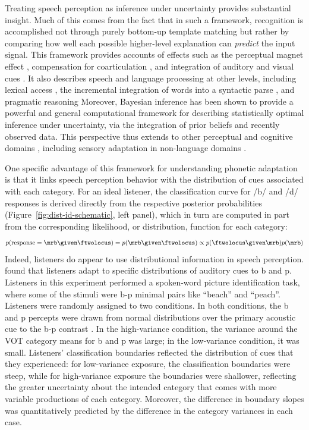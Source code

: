 Treating speech perception as inference under uncertainty provides substantial insight.  Much of this comes from the fact that in such a framework, recognition is accomplished not through purely bottom-up template matching but rather by comparing how well each possible higher-level explanation can \emph{predict} the input signal.
This framework provides accounts of effects such as the perceptual magnet effect \autocite{Feldman2009a}, compensation for coarticulation \autocite{Sonderegger2010}, and integration of auditory and visual cues \autocite{Bejjanki2011}.  It also describes speech and language processing at other levels, including lexical access \autocite{Norris2008}, the incremental integration of words into a syntactic parse \autocite{Hale2001,Levy2008,Levy2008a}, and pragmatic reasoning \autocite{Frank2012,Goodman2013}
Moreover, Bayesian inference has been shown to provide a powerful and general computational framework for describing statistically optimal inference under uncertainty, via the integration of prior beliefs and recently observed data.  This perspective thus extends to other perceptual and cognitive domains \autocite{Griffiths2010,Kersten2004,Tenenbaum2001}, including sensory adaptation in non-language domains \autocite{Fairhall2001,Kording2007a,Stocker2006}.

One specific advantage of this framework for understanding phonetic adaptation is that it links speech perception behavior with the distribution of cues associated with each category.
For an ideal listener, the classification curve for /b/ and /d/ responses is derived directly from the respective posterior probabilities (Figure~\ref{fig:dist-id-schematic}, left panel), which in turn are computed in part from the corresponding likelihood, or distribution, function for each category:
\begin{equation}
  \label{eq:3}
  p(\mathrm{response} = \mrb \given \ftwolocus) = p(\mrb \given \ftwolocus) \propto p(\ftwolocus\given\mrb) p(\mrb)
\end{equation}
Indeed, listeners do appear to use distributional information in speech perception.  \textcite{Clayards2008} found that listeners adapt to specific distributions of auditory cues to \ph b and \ph p.  Listeners in this experiment performed a spoken-word picture identification task, where some of the stimuli were \ph b-\ph p minimal pairs like ``beach'' and ``peach''.  Listeners were randomly assigned to two conditions. In both conditions, the \ph b and \ph p percepts were drawn from normal distributions over the primary acoustic cue to the \ph b-\ph p contrast \autocite[voice onset timing, VOT,][]{Lisker1964}.  In the high-variance condition, the variance around the VOT category means for \ph b and \ph p was large; in the low-variance condition, it was small.  Listeners' classification boundaries reflected the distribution of cues that they experienced: for low-variance exposure, the classification boundaries were steep, while for high-variance exposure the boundaries were shallower, reflecting the greater uncertainty about the intended category that comes with more variable productions of each category.  Moreover, the difference in boundary slopes was quantitatively predicted by the difference in the category variances in each case.

